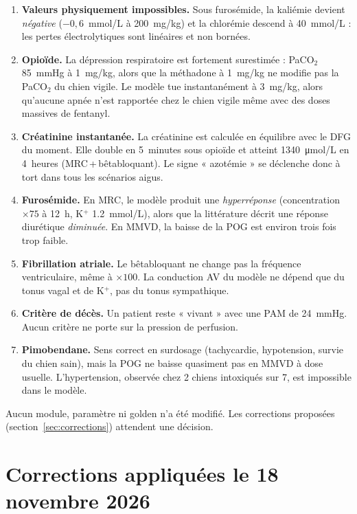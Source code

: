 \documentclass[10pt,a4paper]{article}
\begin{document}
\begin{enumerate}
\item \textbf{Valeurs physiquement impossibles.} Sous furosémide, la kaliémie devient \emph{négative} ($-0{,}6$~mmol/L à \SI{200}{mg/kg}) et la chlorémie descend à \SI{40}{mmol/L} : les pertes électrolytiques sont linéaires et non bornées.
\item \textbf{Opioïde.} La dépression respiratoire est fortement surestimée : PaCO$_2$ \SI{85}{mmHg} à \SI{1}{mg/kg}, alors que la méthadone à \SI{1}{mg/kg} ne modifie pas la PaCO$_2$ du chien vigile. Le modèle tue instantanément à \SI{3}{mg/kg}, alors qu'aucune apnée n'est rapportée chez le chien vigile même avec des doses massives de fentanyl.
\item \textbf{Créatinine instantanée.} La créatinine est calculée en équilibre avec le DFG du moment. Elle double en 5~minutes sous opioïde et atteint \SI{1340}{\micro mol/L} en 4~heures (MRC\,+\,bêtabloquant). Le signe « azotémie » se déclenche donc à tort dans tous les scénarios aigus.
\item \textbf{Furosémide.} En MRC, le modèle produit une \emph{hyperréponse} (concentration $\times 75$ à 12~h, K$^+$ \SI{1,2}{mmol/L}), alors que la littérature décrit une réponse diurétique \emph{diminuée}. En MMVD, la baisse de la POG est environ trois fois trop faible.
\item \textbf{Fibrillation atriale.} Le bêtabloquant ne change pas la fréquence ventriculaire, même à $\times 100$. La conduction AV du modèle ne dépend que du tonus vagal et de K$^+$, pas du tonus sympathique.
\item \textbf{Critère de décès.} Un patient reste « vivant » avec une PAM de \SI{24}{mmHg}. Aucun critère ne porte sur la pression de perfusion.
\item \textbf{Pimobendane.} Sens correct en surdosage (tachycardie, hypotension, survie du chien sain), mais la POG ne baisse quasiment pas en MMVD à dose usuelle. L'hypertension, observée chez 2 chiens intoxiqués sur 7, est impossible dans le modèle.
\end{enumerate}

Aucun module, paramètre ni golden n'a été modifié. Les corrections proposées (section~\ref{sec:corrections}) attendent une décision.

\section*{Corrections appliquées le 18 novembre 2026}
\end{document}
